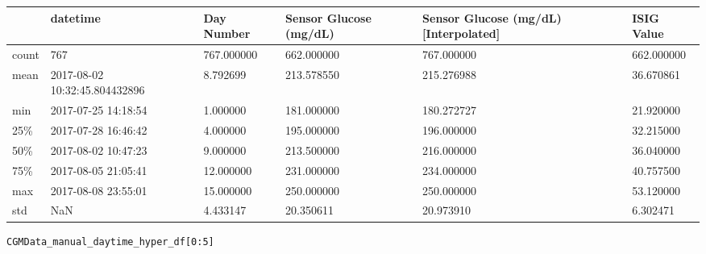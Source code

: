 \bigskip\noindent
\begin{tabular}{p{}p{}p{}p{}p{}p{}}
\toprule
 & datetime & Day Number & Sensor Glucose (mg/dL) & Sensor Glucose (mg/dL) [Interpolated] & ISIG Value \\
\hline
count & 767 & 767.000000 & 662.000000 & 767.000000 & 662.000000 \\
\hline
mean & 2017-08-02 10:32:45.804432896 & 8.792699 & 213.578550 & 215.276988 & 36.670861 \\
\hline
min & 2017-07-25 14:18:54 & 1.000000 & 181.000000 & 180.272727 & 21.920000 \\
\hline
25\% & 2017-07-28 16:46:42 & 4.000000 & 195.000000 & 196.000000 & 32.215000 \\
\hline
50\% & 2017-08-02 10:47:23 & 9.000000 & 213.500000 & 216.000000 & 36.040000 \\
\hline
75\% & 2017-08-05 21:05:41 & 12.000000 & 231.000000 & 234.000000 & 40.757500 \\
\hline
max & 2017-08-08 23:55:01 & 15.000000 & 250.000000 & 250.000000 & 53.120000 \\
\hline
std & NaN & 4.433147 & 20.350611 & 20.973910 & 6.302471 \\
\hline
\bottomrule
\end{tabular}

\bigskip

\begin{verbatim}
CGMData_manual_daytime_hyper_df[0:5]
\end{verbatim}

